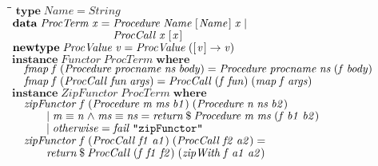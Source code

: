 \documentclass[10pt]{article}
\newlength{\lwidth}\setlength{\lwidth}{4.5cm}
\newlength{\cwidth}\setlength{\cwidth}{8mm} %
\newcommand{\Conid}[1]{\mathit{#1}}
\newcommand{\Varid}[1]{\mathit{#1}}
\begin{document}
\begin{tabbing}
\qquad\=\hspace{\lwidth}\=\hspace{\cwidth}\=\+\kill
${\mathbf{type}\;\Conid{Name}\mathrel{=}\Conid{String}}$\\
${\mathbf{data}\;\Conid{ProcTerm}\;\Varid{x}\mathrel{=}\Conid{Procedure}\;\Conid{Name}\;[\mskip1.5mu \Conid{Name}\mskip1.5mu]\;\Varid{x}\mid }$\\
${\phantom{\mathbf{data}\;\Conid{ProcTerm}\;\Varid{x}\mathrel{=}\mbox{}}\Conid{ProcCall}\;\Varid{x}\;[\mskip1.5mu \Varid{x}\mskip1.5mu]}$\\
${}$\\
${\mathbf{newtype}\;\Conid{ProcValue}\;\Varid{v}\mathrel{=}\Conid{ProcValue}\;([\mskip1.5mu \Varid{v}\mskip1.5mu]\to \Varid{v})}$\\
${}$\\
${\mathbf{instance}\;\Conid{Functor}\;\Conid{ProcTerm}\;\mathbf{where}}$\\
${\hskip1.00em\relax\Varid{fmap}\;\Varid{f}\;(\Conid{Procedure}\;\Varid{procname}\;\Varid{ns}\;\Varid{body})\mathrel{=}\Conid{Procedure}\;\Varid{procname}\;\Varid{ns}\;(\Varid{f}\;\Varid{body})}$\\
${\hskip1.00em\relax\Varid{fmap}\;\Varid{f}\;(\Conid{ProcCall}\;\Varid{fun}\;\Varid{args})\mathrel{=}\Conid{ProcCall}\;(\Varid{f}\;\Varid{fun})\;(\Varid{map}\;\Varid{f}\;\Varid{args})}$\\
${}$\\
${}$\\
${\mathbf{instance}\;\Conid{ZipFunctor}\;\Conid{ProcTerm}\;\mathbf{where}}$\\
${\hskip1.00em\relax\Varid{zipFunctor}\;\Varid{f}\;(\Conid{Procedure}\;\Varid{m}\;\Varid{ms}\;\Varid{b1})\;(\Conid{Procedure}\;\Varid{n}\;\Varid{ns}\;\Varid{b2})}$\\
${\hskip1.00em\relax\hskip2.00em\relax\mid \Varid{m}\equiv \Varid{n}\mathrel{\wedge}\Varid{ms}\equiv \Varid{ns}\mathrel{=}\Varid{return}\mathbin{\$}\Conid{Procedure}\;\Varid{m}\;\Varid{ms}\;(\Varid{f}\;\Varid{b1}\;\Varid{b2})}$\\
${\hskip1.00em\relax\hskip2.00em\relax\mid \Varid{otherwise}\mathrel{=}\Varid{fail}\;\text{\tt \char34 zipFunctor\char34}}$\\
${\hskip1.00em\relax\Varid{zipFunctor}\;\Varid{f}\;(\Conid{ProcCall}\;\Varid{f1}\;\Varid{a1})\;(\Conid{ProcCall}\;\Varid{f2}\;\Varid{a2})\mathrel{=}}$\\
${\hskip1.00em\relax\hskip2.00em\relax\Varid{return}\mathbin{\$}\Conid{ProcCall}\;(\Varid{f}\;\Varid{f1}\;\Varid{f2})\;(\Varid{zipWith}\;\Varid{f}\;\Varid{a1}\;\Varid{a2})}$\\

\end{tabbing}
\end{document}
